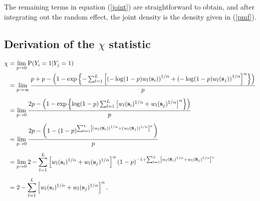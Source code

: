 \documentclass[11pt]{article}
\begin{document}
The remaining terms in equation (\ref{joint}) are straightforward to obtain, and after integrating out the random effect, the joint density is the density given in (\ref{pmf}).

\subsection{Derivation of the $\chi$ statistic}\label{a:chi}
\begin{align} \label{chi}
  \chi &= \lim_{p \rightarrow 0 }\text{P}(Y_i = 1|Y_j = 1)\nonumber \\
   &= \lim_{p \rightarrow \infty }\frac{ p + p - \left( 1 - \exp \left \{ - \sum_{ l = 1 }^{ L } \left[ \left( -\log(1-p) w_{l}(\mbox{\bf s}_i) \right)^{ 1/\alpha } + \left( -\log(1 - p) w_{ l}(\mbox{\bf s}_j) \right)^{ 1/\alpha } \right]^{\alpha} \right \} \right) }{ p } \nonumber \\[0.5em]
  &= \lim_{p \rightarrow 0 } \frac{ 2p - \left( 1 - \exp \left \{ \log(1-p) \sum_{ l = 1 }^{ L } \left[  w_{l}(\mbox{\bf s}_i) ^{ 1/\alpha } +  w_{ l}(\mbox{\bf s}_j) ^{ 1/\alpha } \right]^{\alpha} \right \} \right) }{ p } \nonumber \\[0.5em]
  &= \lim_{p \rightarrow 0 } \frac{ 2p - \left( 1 - (1-p)^{ \sum_{ l = 1 }^{ L } \left[ \left( w_{l}(\mbox{\bf s}_i) \right)^{ 1/\alpha } + \left( w_{ l}(\mbox{\bf s}_j) \right)^{ 1/\alpha } \right]^\alpha } \right) }{ p } \nonumber \\[0.5em]
  &=\lim_{p \rightarrow 0 } 2 -\sum_{ l = 1 }^{ L } \left[ w_{l}(\mbox{\bf s}_i) ^{ 1/\alpha } +  w_{ l} (\mbox{\bf s}_j)^{ 1/\alpha } \right]^\alpha ( 1 - p)^{ -1 + \sum_{ l = 1 }^{ L } \left[  w_{l}(\mbox{\bf s}_i) ^{ 1/\alpha } +  w_{ l}(\mbox{\bf s}_j)^{ 1/\alpha } \right]^\alpha } \nonumber \\[0.5em]
  &= 2 -  \sum_{ l = 1 }^{ L } \left[ w_{l}(\mbox{\bf s}_i)^{ 1/\alpha } +  w_{ l}(\mbox{\bf s}_j) ^{ 1/\alpha } \right]^\alpha.
\end{align}

\begin{singlespace}


\end{singlespace}
\end{document}
